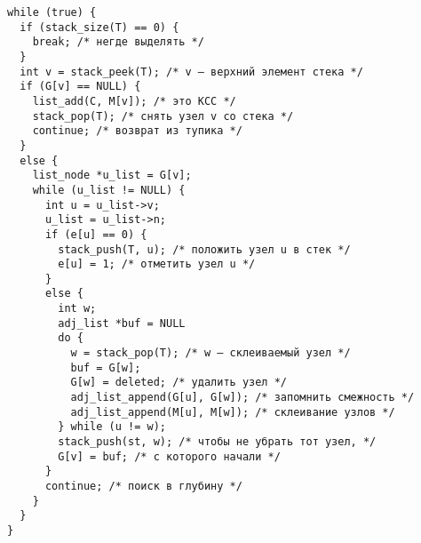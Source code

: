 \documentclass{article}
\begin{document}
\begin{lstlisting}[escapechar=`]
while (true) {
  if (stack_size(T) == 0) {
    break; /* негде выделять */
  }
  int v = stack_peek(T); /* v — верхний элемент стека */
  if (G[v] == NULL) {
    list_add(C, M[v]); /* это КСС */
    stack_pop(T); /* снять узел v со стека */
    continue; /* возврат из тупика */
  }
  else {
    list_node *u_list = G[v];
    while (u_list != NULL) {
      int u = u_list->v;
      u_list = u_list->n;
      if (e[u] == 0) {
        stack_push(T, u); /* положить узел u в стек */
        e[u] = 1; /* отметить узел u */
      }
      else {
        int w;
        adj_list *buf = NULL
        do {
          w = stack_pop(T); /* w — склеиваемый узел */
          buf = G[w];
          G[w] = deleted; /* удалить узел */
          adj_list_append(G[u], G[w]); /* запомнить смежность */
          adj_list_append(M[u], M[w]); /* склеивание узлов */
        } while (u != w);
        stack_push(st, w); /* чтобы не убрать тот узел, */
        G[v] = buf; /* с которого начали */
      }
      continue; /* поиск в глубину */
    }
  }
}
\end{lstlisting}
\end{document}
